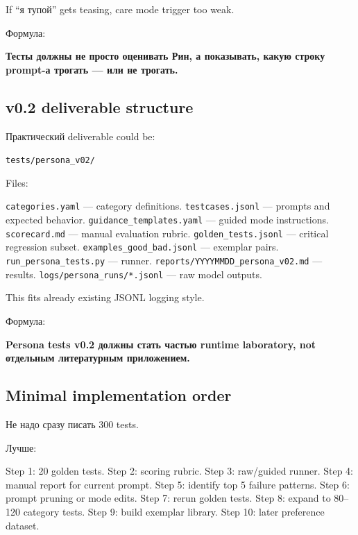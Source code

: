 If ``я тупой'' gets teasing, care mode trigger too weak.

Формула:

\textbf{Тесты должны не просто оценивать Рин, а показывать, какую строку
prompt-а трогать --- или не трогать.}

\subsection*{v0.2 deliverable structure}

Практический deliverable could be:

\texttt{tests/\hspace{0pt}persona\_v02/\hspace{0pt}}

Files:

\texttt{categories.yaml} --- category definitions.
\texttt{testcases.jsonl} --- prompts and expected behavior.
\texttt{guidance\_templates.yaml} --- guided mode instructions.
\texttt{scorecard.md} --- manual evaluation rubric.
\texttt{golden\_tests.jsonl} --- critical regression subset.
\texttt{examples\_good\_bad.jsonl} --- exemplar pairs.
\texttt{run\_persona\_tests.py} --- runner.
\texttt{reports/\hspace{0pt}YYYYMMDD\_persona\_v02.md} --- results.
\texttt{logs/\hspace{0pt}persona\_runs/\hspace{0pt}*.jsonl} --- raw model outputs.

This fits already existing JSONL logging style.

Формула:

\textbf{Persona tests v0.2 должны стать частью runtime laboratory, not
отдельным литературным приложением.}

\subsection*{Minimal implementation order}

Не надо сразу писать 300 tests.

Лучше:

Step 1: 20 golden tests. Step 2: scoring rubric. Step 3: raw/\hspace{0pt}guided
runner. Step 4: manual report for current prompt. Step 5: identify top 5
failure patterns. Step 6: prompt pruning or mode edits. Step 7: rerun
golden tests. Step 8: expand to 80--120 category tests. Step 9: build
exemplar library. Step 10: later preference dataset.

